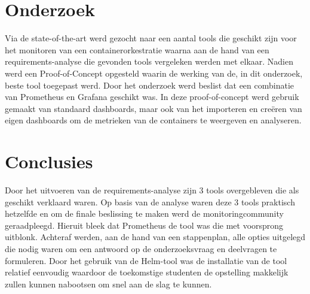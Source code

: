 \documentclass[a0,portrait]{a0poster}
\begin{document}
\begin{multicols}{2}
\color{Black} %
\color{HoGentAccent1} 
\section*{Onderzoek}
\color{black}

Via de state-of-the-art werd gezocht naar een aantal tools die geschikt zijn voor het monitoren van een containerorkestratie waarna aan de hand van een requirements-analyse die gevonden tools vergeleken werden met elkaar. Nadien werd een Proof-of-Concept opgesteld waarin de werking van de, in dit onderzoek, beste tool toegepast werd. Door het onderzoek werd beslist dat een combinatie van Prometheus en Grafana geschikt was. In deze proof-of-concept werd gebruik gemaakt van standaard dashboards, maar ook van het importeren en creëren van eigen dashboards om de metrieken van de containers te weergeven en analyseren.







\color{HoGentAccent1} 
\section*{Conclusies}
\color{black}

Door het uitvoeren van de requirements-analyse zijn 3 tools overgebleven die als geschikt verklaard waren. Op basis van de analyse waren deze 3 tools praktisch hetzelfde en om de finale beslissing te maken werd de monitoringcommunity geraadpleegd. Hieruit bleek dat Prometheus de tool was die met voorsprong uitblonk. Achteraf werden, aan de hand van een stappenplan, alle opties uitgelegd die nodig waren om een antwoord op de onderzoeksvraag en deelvragen te formuleren. Door het gebruik van de Helm-tool was de installatie van de tool relatief eenvoudig waardoor de toekomstige studenten de opstelling makkelijk zullen kunnen nabootsen om snel aan de slag te kunnen. 


\end{multicols}
\end{document}
